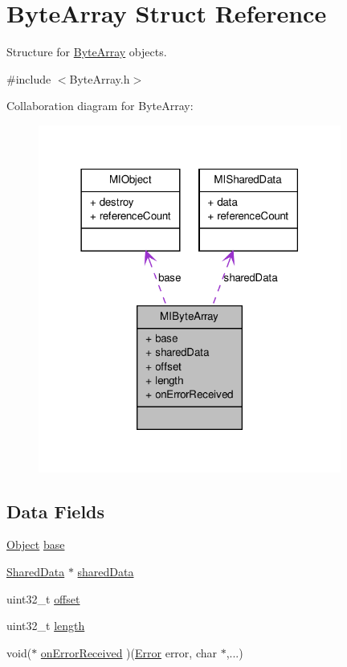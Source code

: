 \hypertarget{struct_m_i_byte_array}{
\section{ByteArray Struct Reference}
\label{struct_m_i_byte_array}
}


Structure for \hyperlink{struct_m_i_byte_array}{ByteArray} objects.  




{\ttfamily \#include $<$ByteArray.h$>$}



Collaboration diagram for ByteArray:
\nopagebreak
\begin{figure}[H]
\begin{center}
\leavevmode
\includegraphics[width=282pt]{struct_m_i_byte_array__coll__graph}
\end{center}
\end{figure}
\subsection*{Data Fields}
\begin{DoxyCompactItemize}
\item 
\hyperlink{struct_m_i_object}{Object} \hyperlink{struct_m_i_byte_array_ad0814be49cef65d1662b278c4c591509}{base}
\item 
\hyperlink{struct_m_i_shared_data}{SharedData} $\ast$ \hyperlink{struct_m_i_byte_array_a2092be3761112a91b7da551b8f834b02}{sharedData}
\item 
uint32\_\-t \hyperlink{struct_m_i_byte_array_a894bdfa2d603d8343f8ef01dda6fcd23}{offset}
\item 
uint32\_\-t \hyperlink{struct_m_i_byte_array_aebb70c2aab3407a9f05334c47131a43b}{length}
\item 
void($\ast$ \hyperlink{struct_m_i_byte_array_aeb0776cff292839518da5f5a48884fd9}{onErrorReceived} )(\hyperlink{_m_i_constants_8h_a78789cd8e7333545dd73768531261968}{Error} error, char $\ast$,...)
\end{DoxyCompactItemize}


